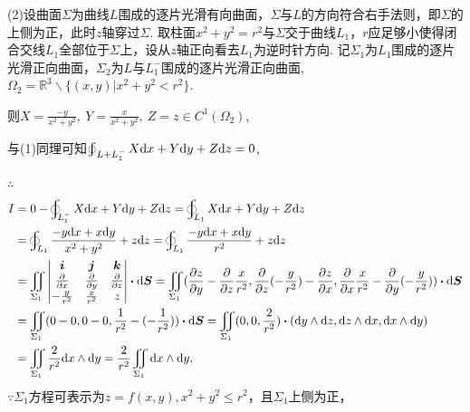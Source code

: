 \documentclass[12pt,UTF8]{ctexart}
\newcommand{\BLOInt}[2]{\varoint\nolimits_{#1}#2}
\newcommand{\md}[1]{\mathrm d#1}
\newcommand{\BSIInt}[2]{\iint\limits_{#1}#2}
\newcommand{\pp}[2]{\frac{\partial #1}{\partial #2}}
\begin{document}
\begin{enumerate}
(2)设曲面$\Sigma$为曲线$L$围成的逐片光滑有向曲面，$\Sigma$与$L$的方向符合右手法则，即$\Sigma$的上侧为正，此时$z$轴穿过$\Sigma$. 取柱面$x^2+y^2=r^2$与$\Sigma$交于曲线$L_1$，$r$应足够小使得闭合交线$L_1$全部位于$\Sigma$上，设从$z$轴正向看去$L_1$为逆时针方向. 记$\Sigma_1$为$L_1$围成的逐片光滑正向曲面，$\Sigma_2$为$L$与$L_1^-$围成的逐片光滑正向曲面, $\Omega_2=\mathbb R^3\backslash\{(x,y)|x^2+y^2<r^2\}$.

则$X=\frac{-y}{x^2+y^2},\ Y=\frac x{x^2+y^2},\ Z=z\in C^1(\Omega_2)$,

与(1)同理可知$\BLOInt{L+L_1^-}{X\md x+Y\md y+Z\md z}=0$,

$\therefore$
\[\begin{aligned}
I&=0-\BLOInt{L_1^-}{X\md x+Y\md y+Z\md z}=\BLOInt{L_1}{X\md x+Y\md y+Z\md z}\\
&=\BLOInt{L_1}{\frac{-y\md x+x\md y}{x^2+y^2}+z\md z}=\BLOInt{L_1}{\frac{-y\md x+x\md y}{r^2}+z\md z}\\
&=\BSIInt{\Sigma_1}{\begin{vmatrix}
\bm i&\bm j&\bm k\\
\frac\partial{\partial x}&\frac\partial{\partial y}&\frac\partial{\partial z}\\
-\frac y{r^2}&\frac x{r^2}&z
\end{vmatrix}\bm\cdot\md\bm S}=\BSIInt{\Sigma_1}{(\pp zy-\frac\partial{\partial z}\frac x{r^2},\frac\partial{\partial z}(-\frac y{r^2})-\pp zx,\frac\partial{\partial x}\frac x{r^2}-\frac\partial{\partial y}(-\frac y{r^2}))\bm\cdot\md\bm S}\\
&=\BSIInt{\Sigma_1}{(0-0,0-0,\frac 1{r^2}-(-\frac 1{r^2}))\bm\cdot\md\bm S}=\BSIInt{\Sigma_1}{(0,0,\frac 2{r^2})\bm\cdot(\md y\wedge\md z,\md z\wedge\md x,\md x\wedge\md y)}\\
&=\BSIInt{\Sigma_1}{\frac 2{r^2}\md x\wedge\md y}=\frac 2{r^2}\BSIInt{\Sigma_1}{\md x\wedge\md y},
\end{aligned}\]
$\because\Sigma_1$方程可表示为$z=f(x,y),x^2+y^2\leqslant r^2$，且$\Sigma_1$上侧为正，


\end{enumerate}
\end{document}
